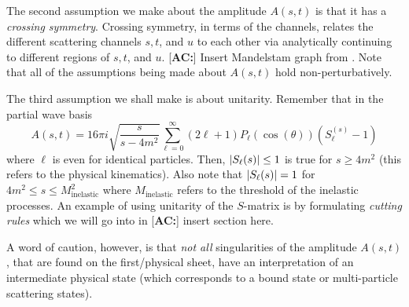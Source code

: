 \documentclass[a4paper,11pt]{article}
\newcommand{\ac}[1]{\textcolor{green3}{[\textbf{AC:}] #1}}
\begin{document}
The second assumption we make about the amplitude $A(s,t)$ is that it has a \textit{crossing symmetry}. Crossing symmetry, in terms of the channels, relates the different scattering channels $s,t$, and $u$ to each other via analytically continuing to different regions of $s,t$, and $u$. \ac{Insert Mandelstam graph from \cite{Eden:1966dnq}}. Note that all of the assumptions being made about $A(s,t)$ hold non-perturbatively. 

The third assumption we shall make is about unitarity. Remember that in the partial wave basis
\begin{equation}
    A(s,t) =16\pi i\sqrt{\frac{s}{s-4m^2}}\sum_{\ell=0}^\infty(2\ell+1)P_\ell(\cos(\theta))\left(S_\ell^{(s)} - 1\right)\label{partial wave basis for phi 4}
\end{equation}
where $\ell$ is even for identical particles. Then, $\abs{S_\ell(s)}\leq 1$ is true for $s\geq 4m^2$ (this refers to the physical kinematics). Also note that $\abs{S_\ell(s)} =1$ for $4m^2\leq s\leq M^2_{\text{inelastic}}$ where $M_{\text{inelastic}}$ refers to the threshold of the inelastic processes. An example of using unitarity of the $S$-matrix is by formulating \textit{cutting rules} which we will go into in \ac{insert section here}. 

A word of caution, however, is that \textit{not all} singularities of the amplitude $A(s,t)$, that are found on the first/physical sheet, have an interpretation of an intermediate physical state (which corresponds to a bound state or multi-particle scattering states). 
\end{document}

